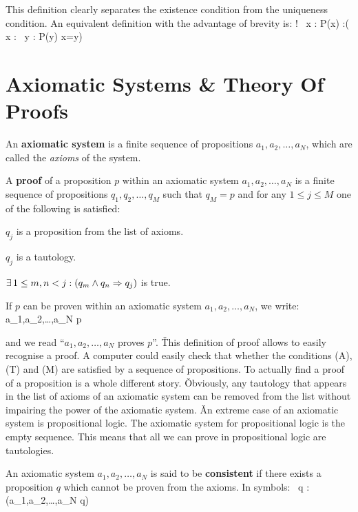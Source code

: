 This definition clearly separates the existence condition from the uniqueness condition. An equivalent definition
with the advantage of brevity is:
\bse
\exists ! \, x : P(x) :\eqv (\exists \, x : \forall \, y : P(y) \eqv x=y)
\ese

\section{Axiomatic Systems \& Theory Of Proofs}

An \textbf{axiomatic system} is a finite sequence of propositions $a_1,a_2, \ldots,a_N$, which are called the
\emph{axioms} of the system.
\ed

\bd [Proof]
A \textbf{proof} of a proposition $p$ within an axiomatic system $a_1,a_2,\ldots,a_N$ is a finite
sequence of propositions $q_1,q_2,\ldots,q_M$ such that $q_M=p$ and for any $1\leq j \leq M$ one of the following is
satisfied:
\ben
\item[(A)] $q_j$ is a proposition from the list of axioms.
\item[(T)] $q_j$ is a tautology.
\item[(M)] $\exists \, 1\leq m,n <j : (q_m\land q_n \Rightarrow q_j)$ is true.
\een
\ed

If $p$ can be proven within an axiomatic system $a_1,a_2,\ldots,a_N$, we write:
\bse
a_1,a_2,\ldots,a_N \vdash p
\ese

and we read ``$a_1,a_2,\ldots,a_N$ proves $p$''. \v

This definition of proof allows to easily recognise a proof. A computer could easily check that whether the
conditions (A), (T) and (M) are satisfied by a sequence of propositions. To actually find a proof of a proposition is
a whole different story. \v

Obviously, any tautology that appears in the list of axioms of an axiomatic system can be removed from the list
without impairing the power of the axiomatic system. \v

An extreme case of an axiomatic system is propositional logic. The axiomatic system for propositional logic is the
empty sequence. This means that all we can prove in propositional logic are tautologies.

\bd [Consistent] An axiomatic system $a_1,a_2,\ldots,a_N$ is said to be \textbf{consistent} if
there exists a proposition $q$ which cannot be proven from the axioms. In symbols:
\bse
\exists \, q : \neg (a_1,a_2,\ldots,a_N \vdash q)
\ese
\ed

